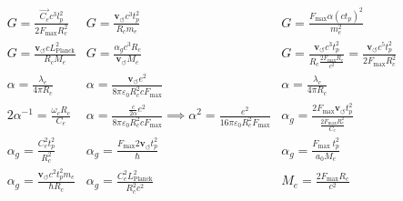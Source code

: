 \documentclass[a4paper,10pt]{article}
\begin{document}
    \begin{equation*}
    \begin{array}{ccc}
            G = \frac{\vec{C_e} c^3 l_p^2}{2 F_{\max } R_c^2} & G = \frac{\mathbf{v}_{\scriptscriptstyle\boldsymbol{\circlearrowleft}} c^3 t_p^2}{R_c m_e} & G = \frac{F_{\operatorname{max}} \alpha (c t_p)^2}{m_e^2} \\
            G = \frac{\mathbf{v}_{\scriptscriptstyle\boldsymbol{\circlearrowleft}} c L_\text{Planck}^2}{R_c M_e} & G = \frac{\alpha_g c^3 R_c}{\mathbf{v}_{\scriptscriptstyle\boldsymbol{\circlearrowleft}} M_e} & G = \frac{\mathbf{v}_{\scriptscriptstyle\boldsymbol{\circlearrowleft}} c^3 t_p^2}{R_c \frac{2 F_{\max} R_c}{c^2}} = \frac{\mathbf{v}_{\scriptscriptstyle\boldsymbol{\circlearrowleft}} c^5 t_p^2}{2 F_{\max} R_c^2} \\
            \alpha = \frac{\lambda_e}{4 \pi R_c} & \alpha = \frac{\mathbf{v}_{\scriptscriptstyle\boldsymbol{\circlearrowleft}} e^2}{8 \pi \varepsilon_0 R_c^2 c F_{\max}} & \alpha = \frac{\lambda_c}{4 \pi R_c} \\
            2\alpha^{-1} = \frac{\omega_c R_c}{C_e} & \alpha = \frac{\frac{c}{2 \alpha} e^2}{8 \pi \varepsilon_0 R_c^2 c F_{\max}} \implies \alpha^2 = \frac{e^2}{16 \pi \varepsilon_0 R_c^2 F_{\max}} & \alpha_g = \frac{2F_{\max} \mathbf{v}_{\scriptscriptstyle\boldsymbol{\circlearrowleft}} t_p^2}{\frac{2F_{\max} R_c^2}{C_e}} \\
            \alpha_g = \frac{C_e^2 t_p^2}{R_c^2} & \alpha_g = \frac{F_{\max} 2 \mathbf{v}_{\scriptscriptstyle\boldsymbol{\circlearrowleft}} t_p^2}{\hbar} & \alpha_g = \frac{F_{\text {max }} t_p^2}{a_0 M_e} \\
            \alpha_g = \frac{\mathbf{v}_{\scriptscriptstyle\boldsymbol{\circlearrowleft}} c^2 t_p^2 m_e}{\hbar R_c} & \alpha_g = \frac{C_e^2 L_\text{Planck}^2}{R_c^2 c^2} & M_e = \frac{2 F_{\max} R_c}{c^2} \\
        \end{array}
    \end{equation*}
\end{document}
